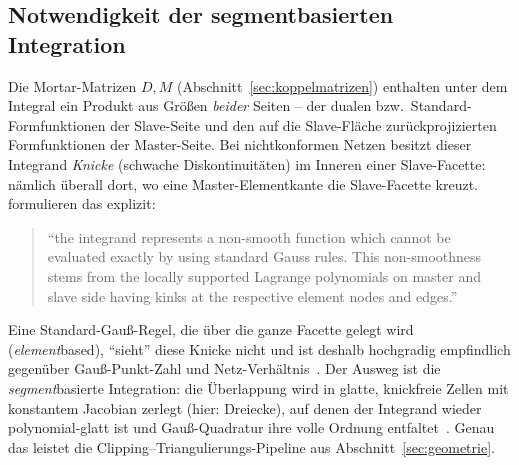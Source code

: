 \documentclass[a4paper,11pt]{article}
\def\bm#1{#1}%
\begin{document}
\subsection{Notwendigkeit der segmentbasierten Integration}
Die Mortar-Matrizen $\bm D,\bm M$ (Abschnitt~\ref{sec:koppelmatrizen}) enthalten unter dem Integral
ein Produkt aus Größen \emph{beider} Seiten -- der dualen bzw.\ Standard-Formfunktionen der
Slave-Seite und den auf die Slave-Fläche zurückprojizierten Formfunktionen der Master-Seite. Bei
nichtkonformen Netzen besitzt dieser Integrand \emph{Knicke} (schwache Diskontinuitäten) im Inneren
einer Slave-Facette: nämlich überall dort, wo eine Master-Elementkante die Slave-Facette kreuzt.
\citet{farah2015} formulieren das explizit:
\begin{quote}
\small ``the integrand represents a non-smooth function which cannot be evaluated exactly by using
standard Gauss rules. This non-smoothness stems from the locally supported Lagrange polynomials on
master and slave side having kinks at the respective element nodes and edges.''
\hfill \citep[S.~214]{farah2015}
\end{quote}
Eine Standard-Gauß-Regel, die über die ganze Facette gelegt wird (\emph{element}based), ``sieht''
diese Knicke nicht und ist deshalb hochgradig empfindlich gegenüber Gauß-Punkt-Zahl und
Netz-Verhältnis~\citep[S.~217]{farah2015}. Der Ausweg ist die \emph{segment}basierte Integration:
die Überlappung wird in glatte, knickfreie Zellen mit konstantem Jacobian zerlegt (hier: Dreiecke),
auf denen der Integrand wieder polynomial-glatt ist und Gauß-Quadratur ihre volle Ordnung
entfaltet~\citep[Abschn.~3.1]{farah2015}. Genau das leistet die Clipping--Triangulierungs-Pipeline aus
Abschnitt~\ref{sec:geometrie}.
\end{document}
